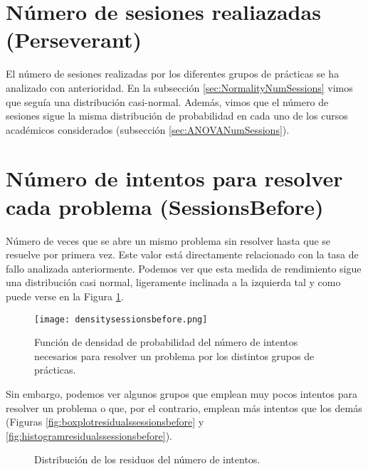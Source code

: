 \section{Número de sesiones realiazadas (Perseverant)}

El número de sesiones realizadas por los diferentes grupos de prácticas se ha analizado con anterioridad. En la subsección \ref{sec:NormalityNumSessions} vimos que seguía una distribución casi-normal. Además, vimos que el número de sesiones sigue la misma distribución de probabilidad en cada uno de los cursos académicos considerados (subsección \ref{sec:ANOVANumSessions}).

\section{Número de intentos para resolver cada problema (SessionsBefore)}

Número de veces que se abre un mismo problema sin resolver hasta que se resuelve por primera vez. Este valor está directamente relacionado con la tasa de fallo analizada anteriormente. Podemos ver que esta medida de rendimiento sigue una distribución casi normal, ligeramente inclinada a la izquierda tal y como puede verse en la Figura \ref{fig:densityplotsessionsbefore}.

\begin{figure}[H]
    \centering
    \texttt{[image: densitysessionsbefore.png]}
    \caption{Función de densidad de probabilidad del número de intentos necesarios para resolver un problema por los distintos grupos de prácticas.}
    \label{fig:densityplotsessionsbefore}
\end{figure}

Sin embargo, podemos ver algunos grupos que emplean muy pocos intentos para resolver un problema o que, por el contrario, emplean más intentos que los demás (Figuras \ref{fig:boxplotresidualssessionsbefore} y \ref{fig:histogramresidualssessionsbefore}).

\begin{figure}[H]
\centering
{}\qquad
{}
\caption{Distribución de los residuos del número de intentos.}
\label{fig:sessionsbefore}
\end{figure}

